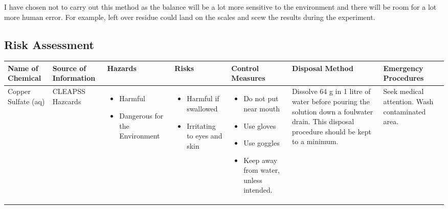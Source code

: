 I have chosen not to carry out this method as the balance will be a lot more sensitive to the environment and there will be room for a lot more human error. For example, left over residue could land on the scales and scew the results during the experiment. 


\begin{landscape}

\section{Risk Assessment}

\begin{center}
\begin{longtable}{|p{1.5cm}|p{1.5cm}|p{3cm}|p{3cm}|p{3cm}|p{3cm}|p{2cm}|}
    \hline
 \textbf{Name of Chemical} & \textbf{Source of Information} & \textbf{Hazards} & \textbf{Risks} & \textbf{Control Measures} & \textbf{Disposal Method} & \textbf{Emergency Procedures} \\ \hline

Copper Sulfate (aq) &
CLEAPSS Hazcards &
\begin{itemize}
\item Harmful
\item Dangerous for the Environment \end{itemize} &
\begin{itemize}
\item Harmful if swallowed
\item Irritating to eyes and skin \end{itemize} &
\begin{itemize}
\item Do not put near mouth
\item Use gloves
\item Use goggles
\item Keep away from water, unless intended. \end{itemize} & 
Dissolve 64 g in 1 litre of water before pouring the solution down a foulwater drain. This disposal procedure should be kept to a minimum. &
Seek medical attention. Wash contaminated area. \\ \hline


\end{longtable}
\end{center}
\end{landscape}
